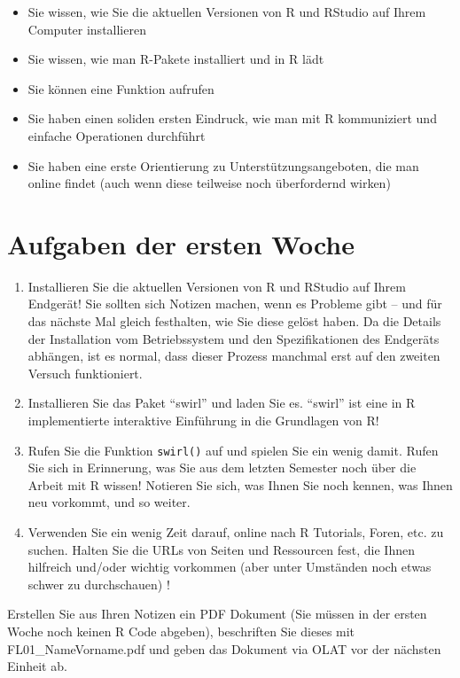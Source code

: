 \documentclass[
]{book}
\providecommand{\tightlist}{%
  \setlength{\itemsep}{0pt}\setlength{\parskip}{0pt}}
\begin{document}
\begin{itemize}
\tightlist
\item
  Sie wissen, wie Sie die aktuellen Versionen von R und RStudio auf Ihrem Computer installieren
\item
  Sie wissen, wie man R-Pakete installiert und in R lädt
\item
  Sie können eine Funktion aufrufen
\item
  Sie haben einen soliden ersten Eindruck, wie man mit R kommuniziert und einfache Operationen durchführt
\item
  Sie haben eine erste Orientierung zu Unterstützungsangeboten, die man online findet (auch wenn diese teilweise noch überfordernd wirken)
\end{itemize}

\hypertarget{aufgaben-der-ersten-woche}{%
\section{Aufgaben der ersten Woche}\label{aufgaben-der-ersten-woche}}

\begin{enumerate}
\def\labelenumi{\arabic{enumi})}
\item
  Installieren Sie die aktuellen Versionen von R und RStudio auf Ihrem Endgerät! Sie sollten sich Notizen machen, wenn es Probleme gibt -- und für das nächste Mal gleich festhalten, wie Sie diese gelöst haben. Da die Details der Installation vom Betriebssystem und den Spezifikationen des Endgeräts abhängen, ist es normal, dass dieser Prozess manchmal erst auf den zweiten Versuch funktioniert.
\item
  Installieren Sie das Paket ``swirl'' und laden Sie es. ``swirl'' ist eine in R implementierte interaktive Einführung in die Grundlagen von R!
\item
  Rufen Sie die Funktion \texttt{swirl()} auf und spielen Sie ein wenig damit. Rufen Sie sich in Erinnerung, was Sie aus dem letzten Semester noch über die Arbeit mit R wissen! Notieren Sie sich, was Ihnen Sie noch kennen, was Ihnen neu vorkommt, und so weiter.
\item
  Verwenden Sie ein wenig Zeit darauf, online nach R Tutorials, Foren, etc. zu suchen. Halten Sie die URLs von Seiten und Ressourcen fest, die Ihnen hilfreich und/oder wichtig vorkommen (aber unter Umständen noch etwas schwer zu durchschauen) !
\end{enumerate}

Erstellen Sie aus Ihren Notizen ein PDF Dokument (Sie müssen in der ersten Woche noch keinen R Code abgeben), beschriften Sie dieses mit FL01\_NameVorname.pdf und geben das Dokument via OLAT vor der nächsten Einheit ab.

  
\end{document}
